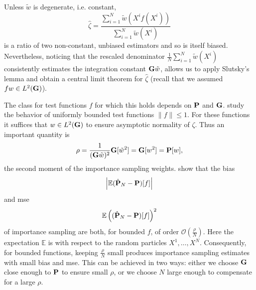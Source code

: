 Unless $\tilde w$ is degenerate, i.e. constant, $$\hat\zeta = \frac{\sum_{i = 1}^N \tilde w (X^{i} f(X^{i}))}{\sum_{i = 1}^{N} \tilde w(X^{i})}$$ is a ratio of two non-constant, unbiased estimators and so is itself biased. Nevertheless, noticing that the rescaled denominator $\frac{1}{N} \sum_{i = 1}^{N} \tilde w(X^{i})$ consistently estimates the integration constant $\G \tilde w$, allows us to apply Slutsky's lemma and obtain a central limit theorem for $\hat \zeta$ (recall that we assumed $fw \in L^{2}(\G)$).

The class for test functions $f$ for which this holds depends on $\P$ and $\G$. \citep{Agapiou2017Importance} study the behavior of uniformly bounded test functions $\lVert f \rVert \leq 1$. For these functions it suffices that $w \in L^{2}(\G)$ to ensure asymptotic normality of $\zeta$. 
Thus an important quantity is
$$
\rho = \frac{1}{(\G \tilde w)^{2}}\G[\tilde w^{2}] = \G [w^{2}] =  \P [w],
$$
the second moment of the importance sampling weights. \citep{Agapiou2017Importance} show that the bias 
$$
\left| \mathbb E (\hat\P_{N} - \P)[f] \right|
$$
and \acrfull{mse}
$$
\mathbb E \left( (\hat \P_{N} - \P) [f] \right)^{2}
$$
of importance sampling are both, for bounded $f$, of order $\mathcal O \left(\frac{\rho}{N}\right)$. Here the expectation $\mathbb E$ is with respect to the random particles $X^{1}, \dots, X^{N}$. Consequently, for bounded functions, keeping $ \frac{\rho}{N}$ small produces importance sampling estimates with small bias and \acrshort{mse}. This can be achieved in two ways: either we choose $\G$ \glqq{}close enough\grqq{} to $\P$ to ensure small $\rho$, or we choose $N$ large enough to compensate for a large $\rho$.


